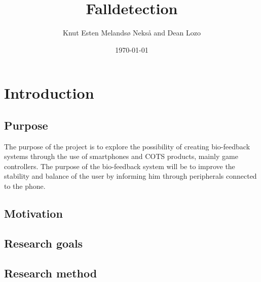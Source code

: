 \documentclass[11pt,twoside,a4paper]{report}
\begin{document}
\title{Falldetection}
\author{Knut Esten Melandsø Nekså and Dean Lozo}
\date{\today}
\maketitle


\begin{abstract}

\end{abstract}

\tableofcontents

\chapter{Introduction}

\section{Purpose}
The purpose of the project is to explore the possibility of creating bio-feedback systems through the use of smartphones and COTS products, mainly game controllers. The purpose of the bio-feedback system will be to improve the stability and balance of the user by informing him through peripherals connected to the phone.

\section{Motivation}


\section{Research goals}

\section{Research method}
\end{document}
